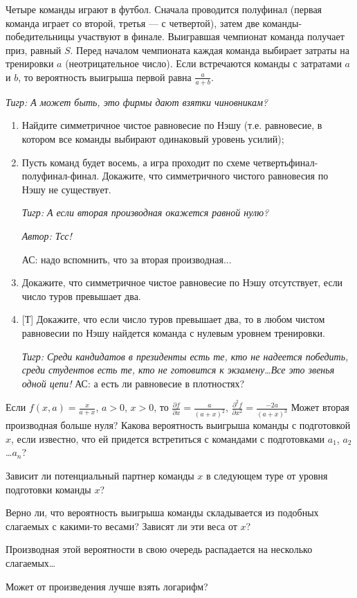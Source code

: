 \begin{problem}[Футбол]
Четыре команды играют в футбол. Сначала проводится полуфинал (первая команда играет со второй, третья --- с четвертой), затем две команды-победительницы участвуют в финале. Выигравшая чемпионат команда получает приз, равный  $S$. Перед началом чемпионата каждая команда выбирает затраты на тренировки  $a$  (неотрицательное число). Если встречаются команды с затратами  $a$  и  $b$, то вероятность выигрыша первой равна  $\frac{a}{a+b} $.\par
{\it Тигр: А может быть, это фирмы дают взятки чиновникам?}\par
\begin{enumerate}
\item Найдите симметричное чистое равновесие  по Нэшу (т.е. равновесие, в котором все команды выбирают одинаковый уровень усилий);\par
\item Пусть команд будет восемь, а игра проходит по схеме четвертьфинал-полуфинал-финал. Докажите, что симметричного чистого равновесия по Нэшу не существует.\par
{\it Тигр: А если вторая производная  окажется равной нулю?}\par
{\it  Автор: Тсс!}\par
{\red АС: надо вспомнить, что за вторая производная...}
\item  Докажите, что симметричное чистое равновесие по Нэшу отсутствует, если число туров превышает два.\par
\item {[Т]} Докажите, что если число туров превышает два, то в любом чистом равновесии по Нэшу найдется команда с нулевым уровнем тренировки.\par
{\it Тигр: Среди кандидатов в президенты есть те, кто не надеется победить, среди студентов есть те, кто не готовится к экзамену\ldots Все это звенья одной цепи!}
{\red АС: а есть ли равновесие в плотностях?}
\end{enumerate}



\begin{sol}
Если  $f\left(x,a\right)=\frac{x}{a+x} $,  $a>0$,  $x>0$, то  $\frac{\partial f}{\partial x} =\frac{a}{\left(a+x\right)^{2} } $,  $\frac{\partial ^{2} f}{\partial x^{2} } =\frac{-2a}{\left(a+x\right)^{3} } $
Может вторая производная больше нуля?
Какова вероятность выигрыша команды с подготовкой  $x$, если известно, что ей придется встретиться с командами с подготовками  $a_{1} $,  $a_{2} $ \ldots  $a_{n} $? \par
Зависит ли потенциальный партнер команды  $x$  в следующем туре от уровня подготовки команды  $x$?\par
Верно ли, что вероятность выигрыша команды складывается из подобных слагаемых с какими-то весами? Зависят ли эти веса от  $x$?\par
Производная этой вероятности в свою очередь распадается на несколько слагаемых\ldots \par
Может от произведения лучше взять логарифм?
\end{sol}
\end{problem}


